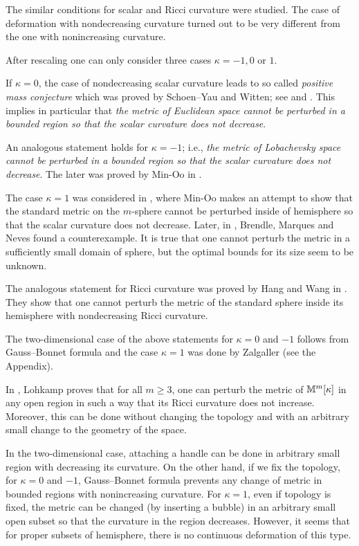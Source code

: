 \documentclass[oneside,a4paper]{article}
\begin{document}
The similar conditions for scalar and Ricci curvature were studied.
The case of deformation with nondecreasing  curvature turned out to be very different from the one with
nonincreasing curvature. 

After rescaling one can only consider three cases $\kappa=-1,0$ or $1$.

If $\kappa=0$,
the case of nondecreasing scalar curvature leads to so called
\emph{positive mass conjecture} which was proved by Schoen--Yau and 
Witten;
see
\cite{schoen-yau} and 
\cite{witten}.
This implies in particular that
\textit{the metric of Euclidean space cannot be perturbed in a bounded region so that the scalar curvature does not decrease}.

An analogous statement holds for $\kappa=-1$;
i.e., \textit{the metric of Lobachevsky space cannot be perturbed in a bounded region so that the scalar curvature does not decrease}.
The later was proved by Min-Oo in \cite{oo-lob}.

The case $\kappa=1$ was considered in \cite{oo},
where Min-Oo  makes an attempt to show that the standard metric on the $m$-sphere
cannot be perturbed inside of hemisphere so that the scalar curvature does
not decrease.
Later, in \cite{brendle-marques-neves}, Brendle, Marques and Neves found a counterexample.
It is true that one cannot perturb the metric in a sufficiently small domain of sphere,
but the optimal bounds for its size seem to be unknown.

The analogous statement for Ricci curvature was proved by Hang and Wang in \cite{hang-wang}.
They show that one cannot perturb the metric of the standard sphere inside its hemisphere with nondecreasing Ricci curvature.

The two-dimensional case of the above statements for $\kappa=0$ and $-1$ follows from Gauss--Bonnet formula
and the case $\kappa=1$ was done by Zalgaller (see the Appendix).


In \cite{lohkamp-Ricc}, Lohkamp proves that
for all $m\ge3$,
one can perturb the metric of $\mathbb{M}^m[\kappa]$ in any open region
in such a way that its Ricci curvature does not increase.
Moreover, this can be done without changing the topology 
and with an arbitrary small change to the geometry of the space.

In the two-dimensional case, attaching a handle can be done in arbitrary small region with decreasing its curvature.
On the other hand, if we fix the topology, for $\kappa=0$ and $-1$,
Gauss--Bonnet formula prevents any change of metric in bounded regions
with nonincreasing curvature.
For $\kappa=1$, even if topology is fixed,
the metric can be changed (by inserting a bubble) in an arbitrary small open subset
so that the curvature in the region decreases. However, it seems that for proper
subsets of hemisphere, there is no continuous deformation of this type.
\end{document}
